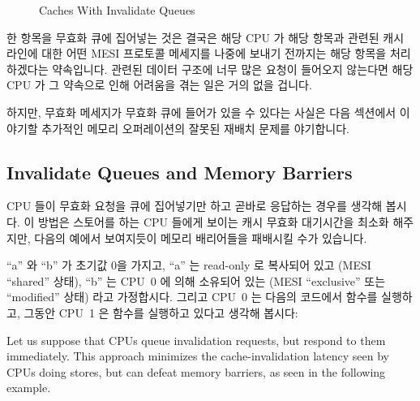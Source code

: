\begin{figure}[htb]
\begin{center}
\end{center}
\caption{Caches With Invalidate Queues}
\label{fig:app:whymb:Caches With Invalidate Queues}
\end{figure}

한 항목을 무효화 큐에 집어넣는 것은 결국은 해당 CPU 가 해당 항목과 관련된 캐시
라인에 대한 어떤 MESI 프로토콜 메세지를 나중에 보내기 전까지는 해당 항목을
처리하겠다는 약속입니다.
관련된 데이터 구조에 너무 많은 요청이 들어오지 않는다면 해당 CPU 가 그 약속으로
인해 어려움을 겪는 일은 거의 없을 겁니다.

하지만, 무효화 메세지가 무효화 큐에 들어가 있을 수 있다는 사실은 다음 섹션에서
이야기할 추가적인 메모리 오퍼레이션의 잘못된 재배치 문제를 야기합니다.

\subsection{Invalidate Queues and Memory Barriers}
\label{sec:app:whymb:Invalidate Queues and Memory Barriers}

CPU 들이 무효화 요청을 큐에 집어넣기만 하고 곧바로 응답하는 경우를 생각해
봅시다.
이 방법은 스토어를 하는 CPU 들에게 보이는 캐시 무효화 대기시간을 최소화
해주지만, 다음의 예에서 보여지듯이 메모리 배리어들을 패배시킬 수가 있습니다.

``a'' 와 ``b'' 가 초기값 0을 가지고, ``a'' 는 read-only 로 복사되어 있고 (MESI
``shared'' 상태), ``b'' 는 CPU~0 에 의해 소유되어 있는 (MESI ``exclusive'' 또는
``modified'' 상태) 라고 가정합시다.
그리고 CPU~0 는 다음의 코드에서  함수를 실행하고, 그동안 CPU~1 은
  함수를 실행하고 있다고 생각해 봅시다:
\iffalse

Let us suppose that CPUs queue invalidation requests, but respond to
them immediately.
This approach minimizes the cache-invalidation latency seen by CPUs
doing stores, but can defeat memory barriers, as seen in the following
example.

